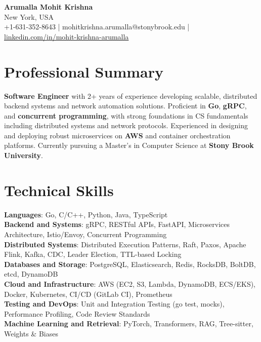 \documentclass[letterpaper,11pt]{article}
\begin{document}
\begin{center}
  {\Large \textbf{Arumalla Mohit Krishna}} \\
  New York, USA \\
  +1-631-352-8643 \enspace | \enspace mohitkrishna.arumalla@stonybrook.edu \enspace | \enspace \href{https://www.linkedin.com/in/mohit-krishna-arumalla}{linkedin.com/in/mohit-krishna-arumalla}
\end{center}

\section{Professional Summary}
  \begin{itemize}[leftmargin=0.15in, label={}]
    \small{\item{
     \textbf{Software Engineer} with 2+ years of experience developing scalable, distributed backend systems and network automation solutions. Proficient in \textbf{Go}, \textbf{gRPC}, and \textbf{concurrent programming}, with strong foundations in CS fundamentals including distributed systems and network protocols. Experienced in designing and deploying robust microservices on \textbf{AWS} and container orchestration platforms. Currently pursuing a Master’s in Computer Science at \textbf{Stony Brook University}.
    }}
  \end{itemize}
\vspace{-16pt}

\section{Technical Skills}
 \begin{itemize}[leftmargin=0.15in, label={}]
    \small{\item{
     \textbf{Languages}: Go, C/C++, Python, Java, TypeScript \\
     \textbf{Backend and Systems}: gRPC, RESTful APIs, FastAPI, Microservices Architecture, Istio/Envoy, Concurrent Programming \\
     \textbf{Distributed Systems}: Distributed Execution Patterns, Raft, Paxos, Apache Flink, Kafka, CDC, Leader Election, TTL-based Locking \\
     \textbf{Databases and Storage}: PostgreSQL, Elasticsearch, Redis, RocksDB, BoltDB, etcd, DynamoDB \\
     \textbf{Cloud and Infrastructure}: AWS (EC2, S3, Lambda, DynamoDB, ECS/EKS), Docker, Kubernetes, CI/CD (GitLab CI), Prometheus \\
     \textbf{Testing and DevOps}: Unit and Integration Testing (go test, mocks), Performance Profiling, Code Review Standards \\
     \textbf{Machine Learning and Retrieval}: PyTorch, Transformers, RAG, Tree-sitter, Weights \& Biases
    }}
 \end{itemize}
\vspace{-16pt}
\end{document}
